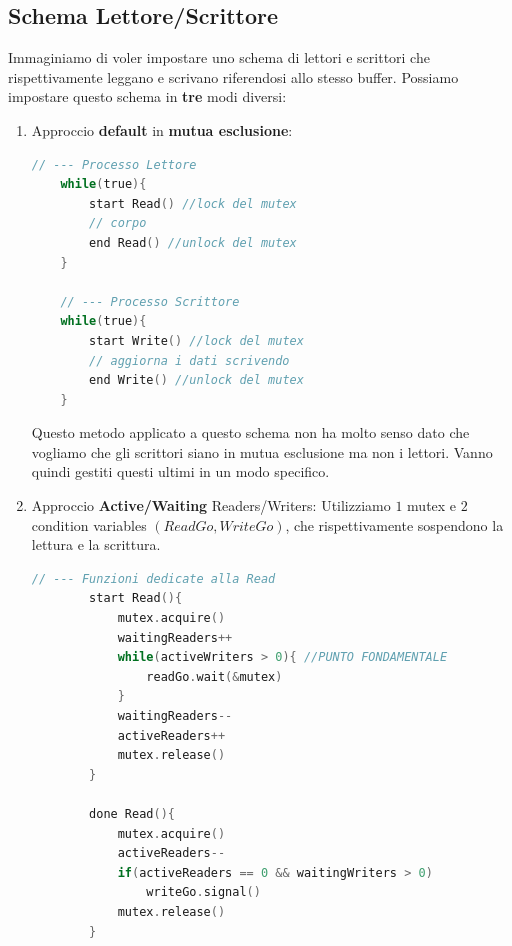 \documentclass{article}
\begin{document}
\vspace*{15px}

\subsection{Schema Lettore/Scrittore}

Immaginiamo di voler impostare uno schema di lettori e scrittori che rispettivamente leggano e scrivano riferendosi allo stesso buffer.
Possiamo impostare questo schema in \textbf{tre} modi diversi:

\begin{enumerate}
    \item Approccio \textbf{default} in \textbf{mutua esclusione}:
    \vspace*{8px}
    \begin{lstlisting}[language = C]
    // --- Processo Lettore
    while(true){
        start Read() //lock del mutex
        // corpo
        end Read() //unlock del mutex
    }

    // --- Processo Scrittore
    while(true){
        start Write() //lock del mutex
        // aggiorna i dati scrivendo
        end Write() //unlock del mutex
    }
    \end{lstlisting}
    
Questo metodo applicato a questo schema non ha molto senso dato che vogliamo che gli scrittori siano in mutua esclusione ma non i lettori. Vanno quindi gestiti
questi ultimi in un modo specifico.

\newpage

    \item Approccio \textbf{Active/Waiting} Readers/Writers:
    Utilizziamo $1$ mutex e $2$ condition variables $(ReadGo, WriteGo)$, che rispettivamente sospendono la lettura e la scrittura.
    \vspace*{8px}
    \begin{lstlisting}[language = C]
        // --- Funzioni dedicate alla Read
        start Read(){
            mutex.acquire()
            waitingReaders++
            while(activeWriters > 0){ //PUNTO FONDAMENTALE
                readGo.wait(&mutex)
            }
            waitingReaders--
            activeReaders++
            mutex.release()
        }

        done Read(){
            mutex.acquire()
            activeReaders--
            if(activeReaders == 0 && waitingWriters > 0)
                writeGo.signal()
            mutex.release()
        }


\end{lstlisting}
\end{enumerate}
\end{document}
